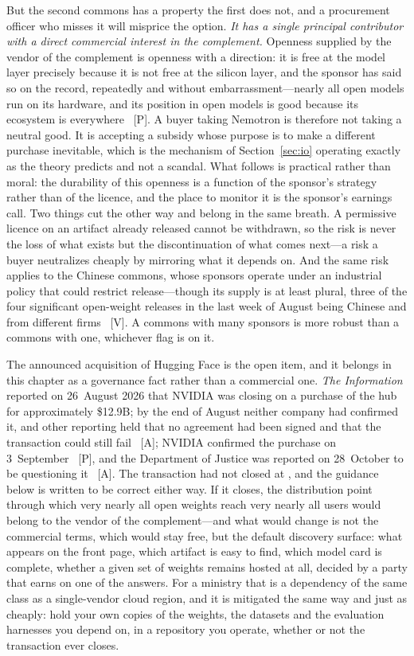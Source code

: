 But the second commons has a property the first does not, and a procurement officer who misses it will misprice the option. \emph{It has a single principal contributor with a direct commercial interest in the complement.} Openness supplied by the vendor of the complement is openness with a direction: it is free at the model layer precisely because it is not free at the silicon layer, and the sponsor has said so on the record, repeatedly and without embarrassment---nearly all open models run on its hardware, and its position in open models is good because its ecosystem is everywhere~\cite{nvda-open-models} [P]. A buyer taking Nemotron is therefore not taking a neutral good. It is accepting a subsidy whose purpose is to make a different purchase inevitable, which is the mechanism of Section~\ref{sec:io} operating exactly as the theory predicts and not a scandal. What follows is practical rather than moral: the durability of this openness is a function of the sponsor's strategy rather than of the licence, and the place to monitor it is the sponsor's earnings call. Two things cut the other way and belong in the same breath. A permissive licence on an artifact already released cannot be withdrawn, so the risk is never the loss of what exists but the discontinuation of what comes next---a risk a buyer neutralizes cheaply by mirroring what it depends on. And the same risk applies to the Chinese commons, whose sponsors operate under an industrial policy that could restrict release---though its supply is at least plural, three of the four significant open-weight releases in the last week of August being Chinese and from different firms~\cite{hunyuan-hy4} [V]. A commons with many sponsors is more robust than a commons with one, whichever flag is on it.

The announced acquisition of Hugging Face is the open item, and it belongs in this chapter as a governance fact rather than a commercial one. \emph{The Information} reported on 26~August 2026 that NVIDIA was closing on a purchase of the hub for approximately \$12.9B; by the end of August neither company had confirmed it, and other reporting held that no agreement had been signed and that the transaction could still fail~\cite{nvda-hf} [A]; NVIDIA confirmed the purchase on 3~September~\cite{mdl-nvda-hf-confirm} [P], and the Department of Justice was reported on 28~October to be questioning it~\cite{mdl-doj-hf} [A]. The transaction had not closed at \datafreeze, and the guidance below is written to be correct either way. If it closes, the distribution point through which very nearly all open weights reach very nearly all users would belong to the vendor of the complement---and what would change is not the commercial terms, which would stay free, but the default discovery surface: what appears on the front page, which artifact is easy to find, which model card is complete, whether a given set of weights remains hosted at all, decided by a party that earns on one of the answers. For a ministry that is a dependency of the same class as a single-vendor cloud region, and it is mitigated the same way and just as cheaply: hold your own copies of the weights, the datasets and the evaluation harnesses you depend on, in a repository you operate, whether or not the transaction ever closes.

